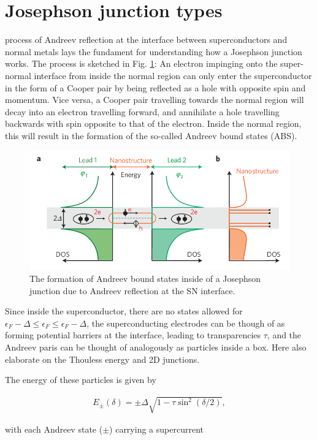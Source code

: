 \section{Josephson junction types}

 process of Andreev reflection at the interface between superconductors and normal metals lays the fundament for understanding how a Josephson junction works. The process is sketched in Fig. \ref{fig:kdtmk}: An electron impinging onto the super-normal interface from inside the normal region can only enter the superconductor in the form of a Cooper pair by being reflected as a hole with opposite spin and momentum. Vice versa, a Cooper pair travelling towards the normal region will decay into an electron travelling forward, and annihilate a hole travelling backwards with spin opposite to that of the electron. Inside the normal region, this will result in the formation of the so-called Andreev bound states (ABS).

\begin{figure}
	\centering
	\includegraphics[width=0.7\linewidth]{./chapter-theory/figs-JJ/KDTMK}
	\caption{The formation of Andreev bound states inside of a Josephson junction due to Andreev reflection at the SN interface.}
	\label{fig:kdtmk}
\end{figure}

Since inside the superconductor, there are no states allowed for $\epsilon_F - \Delta \leq \epsilon_F \leq \epsilon_F - \Delta$, the superconducting electrodes can be though of as forming potential barriers at the interface, leading to transparencies $\tau$, and the Andreev paris can be thought of analogously as particles inside a box.
Here also elaborate on the Thouless energy and 2D junctions.

The energy of these particles is given by

\begin{eqnarray}
E_{\pm}(\delta)=\pm\Delta\sqrt{1-\tau\sin^2(\delta/2)},
\end{eqnarray}

with each Andreev state ($\pm$) carrying a supercurrent

